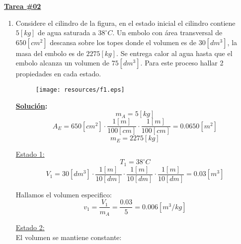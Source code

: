 \documentclass[letter,11pt]{article}
\begin{document}
\begin{center}
    {\Large \bf{\underline{Tarea \#02}}}
\end{center}
\vspace{0.1cm}

\begin{enumerate}
\item Considere el cilindro de la figura, en el estado inicial el
cilindro contiene $5[kg]$ de agua saturada a $38^\circ C$. Un embolo con área
transversal de $650[cm^2]$ descansa sobre los topes donde el volumen es de
$30[dm^3]$, la masa del embolo es de $2275[kg]$. Se entrega calor al agua hasta
que el embolo alcanza un volumen de $75[dm^3]$. Para este proceso hallar 2
propiedades en cada estado.

\vspace{0.75cm}
\begin{figure}[!h]
\centering
\texttt{[image: resources/f1.eps]}
\end{figure}
\vspace{0.75cm}

\textbf{\underline{Solución}:} \\

\begin{equation*}
    m_A=5[kg]
\end{equation*}
\begin{equation*}
    A_E=650[cm^2]\cdot\frac{1[m]}{100[cm]}\cdot\frac{1[m]}{100[cm]}=0.0650[m^2]
\end{equation*}
\begin{equation*}
    m_E=2275[kg]
\end{equation*}

\underline{Estado 1:} \\

\begin{equation*}
    T_1=38^\circ C
\end{equation*}
\begin{equation*}
    V_1=30[dm^3]\cdot\frac{1[m]}{10[dm]}\cdot\frac{1[m]}{10[dm]}\cdot\frac{1[m]}{10[dm]}=0.03[m^3]
\end{equation*}

Hallamos el volumen especifico:
\begin{equation*}
    v_1=\frac{V_1}{m_A}=\frac{0.03}{5}=0.006[m^3/kg]
\end{equation*}

\underline{Estado 2:} \\

El volumen se mantiene constante:


\end{enumerate}
\end{document}
